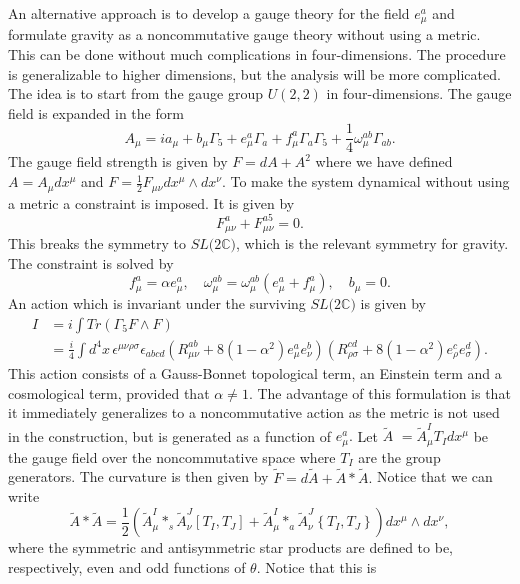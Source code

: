 \documentclass[a4paper,12pt]{article}
\begin{document}
An alternative approach is to develop a gauge theory for the field $e_{\mu
}^{a}$ and formulate gravity as a noncommutative gauge theory without using a
metric. This can be done without much complications in four-dimensions. The
procedure is generalizable to higher dimensions, but the analysis will be more
complicated. The idea is to start from the gauge group $U(2,2)$ in
four-dimensions. The gauge field is expanded in the form \cite{ali2}%
\[
A_{\mu}=ia_{\mu}+b_{\mu}\Gamma_{5}+e_{\mu}^{a}\Gamma_{a}+f_{\mu}^{a}\Gamma
_{a}\Gamma_{5}+\frac{1}{4}\omega_{\mu}^{ab}\Gamma_{ab}.
\]
The gauge field strength is given by $F=dA+A^{2}$ where we have defined
$A=A_{\mu}dx^{\mu}$ and $F=\frac{1}{2}F_{\mu\nu}dx^{\mu}\wedge dx^{\nu}.$ To
make the system dynamical without using a metric a constraint is imposed. It
is given by%
\[
F_{\mu\nu}^{a}+F_{\mu\nu}^{a5}=0.
\]
This breaks the symmetry to $SL(2\mathbb{C)}$, which is the relevant symmetry
for gravity. The constraint is solved by
\[
f_{\mu}^{a}=\alpha e_{\mu}^{a},\quad\omega_{\mu}^{ab}=\omega_{\mu}^{ab}\left(
e_{\mu}^{a}+f_{\mu}^{a}\right)  ,\quad b_{\mu}=0.
\]
An action which is invariant under the surviving $SL(2\mathbb{C)}$ is given by%
\begin{align*}
I &  =i\int Tr\left(  \Gamma_{5}F\wedge F\right)  \\
&  =\frac{i}{4}\int d^{4}x\,\epsilon^{\mu\nu\rho\sigma}\epsilon_{abcd}\left(
R_{\mu\nu}^{ab}+8\left(  1-\alpha^{2}\right)  e_{\mu}^{a}e_{\nu}^{b}\right)
\left(  R_{\rho\sigma}^{cd}+8\left(  1-\alpha^{2}\right)  e_{\rho}%
^{c}e_{\sigma}^{d}\right)  .
\end{align*}
This action consists of a Gauss-Bonnet topological term, an Einstein term and
a cosmological term, provided that $\alpha\neq1.$ The advantage of this
formulation is that it immediately generalizes to a noncommutative action as
the metric is not used in the construction, but is generated as a function of
$e_{\mu}^{a}.$ Let $\widetilde{A}$ $=\widetilde{A}_{\mu}^{I}T_{I}dx^{\mu}$ be
the gauge field over the noncommutative space where $T_{I}$ are the group
generators. The curvature is then given by $\widetilde{F}=d\widetilde
{A}+\widetilde{A}\ast\widetilde{A}.$ Notice that we can write
\[
\widetilde{A}\ast\widetilde{A}=\frac{1}{2}\left(  \widetilde{A}_{\mu}^{I}%
\ast_{s}\widetilde{A}_{\nu}^{J}\left[  T_{I},T_{J}\right]  +\widetilde{A}%
_{\mu}^{I}\ast_{a}\widetilde{A}_{\nu}^{J}\left\{  T_{I},T_{J}\right\}
\right)  dx^{\mu}\wedge dx^{\nu},
\]
where the symmetric and antisymmetric star products are defined to be,
respectively, even and odd functions of $\theta.$ Notice that this is
\end{document}
